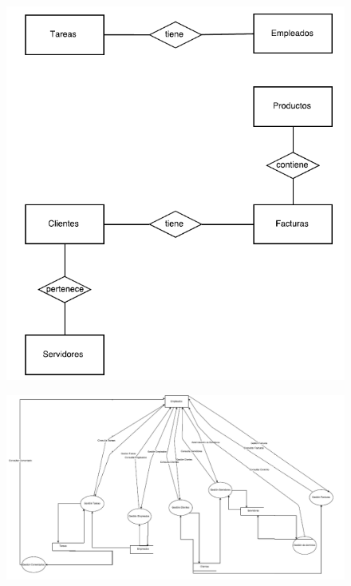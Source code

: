 \documentclass[paper=a4, fontsize=11pt, spanish]{scrartcl}
\begin{document}
\begin{figure}
	\includegraphics{PrimerRefD.png}
	\caption{}
	\label{fig:PrimerRefD}
\end{figure}

\begin{figure}
	\includegraphics[width=1.25\textwidth]{SegundoRefF.png}
	\caption{}
	\label{fig:SegundoRefF}
\end{figure}
\end{document}
